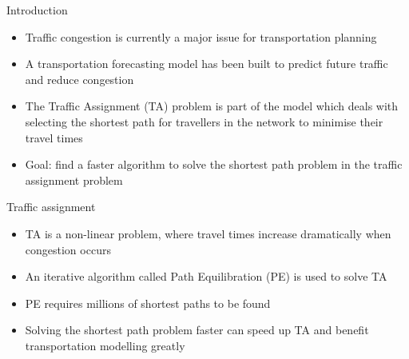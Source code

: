 \documentclass[final]{beamer}
\begin{document}
\begin{frame}{ }
    \begin{columns}[t]
        \begin{column}{.26\linewidth}

            \begin{block}{Introduction}
                \begin{itemize}
                    \itemsep.4em
                    \item Traffic congestion is currently a major issue for transportation planning
                    \item A transportation forecasting model has been built to predict future traffic and reduce congestion
                    \item The \alert{Traffic Assignment (TA)} problem is part of the model which deals with \alert{selecting the shortest path} for travellers in the network to \alert{minimise} their \alert{travel times}
                \item \alert{Goal}: find a faster algorithm to solve the shortest path problem in the traffic assignment problem
            \end{itemize}
        \end{block}

        \begin{block}{Traffic assignment}
            \begin{itemize}
                \itemsep.4em
                \item TA is a non-linear problem, where travel times increase dramatically when congestion occurs
                \item An \alert{iterative} algorithm called \alert{Path Equilibration (PE)} is used to solve TA
                \item PE requires \alert{millions of shortest paths} to be found
                \item Solving the shortest path problem faster can speed up TA and benefit transportation modelling greatly
            \end{itemize}
        \end{block}


\end{column}
\end{columns}
\end{frame}
\end{document}
